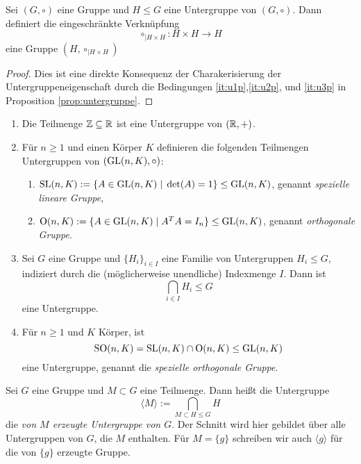 \documentclass{book}
\begin{document}
\begin{cor}
    Sei $(G,\circ)$ eine Gruppe und $H \leq G$ eine Untergruppe von $(G,\circ)$. Dann definiert die eingeschränkte Verknüpfung
    \[
        \circ_{|H \times H} : H \times H \to H
    \]
    eine Gruppe $(H, \circ_{|H \times H})$
\end{cor}
\begin{proof}
    Dies ist eine direkte Konsequenz der Charakerisierung der
    Untergruppeneigenschaft durch die Bedingungen \ref{it:u1p},\ref{it:u2p},
    und \ref{it:u3p} in Proposition \ref{prop:untergruppe}.
\end{proof}
    
\begin{exas}
\label{exas:untergruppen}
    \begin{enumerate}
        \item Die Teilmenge $\mathbb{Z} \subseteq \mathbb{R}$ ist eine Untergruppe von $(\mathbb{R},+)$. 
        \item Für $n \ge 1$ und einen Körper $K$ definieren die folgenden Teilmengen Untergruppen von $(\operatorname{GL}(n,K), \circ)$:
            \begin{enumerate}
                \item $\operatorname{SL}(n,K) := \{A \in \operatorname{GL}(n,K)\;  | \; \det(A) = 1 \} \leq \operatorname{GL}(n,K)$, genannt {\em spezielle lineare Gruppe},
                \item $\operatorname{O}(n,K) := \{A \in \operatorname{GL}(n,K)\; | \; A^TA = I_n \} \leq \operatorname{GL}(n,K)$, genannt {\em orthogonale Gruppe}.
            \end{enumerate}
        \item Sei $G$ eine Gruppe und $\{H_i\}_{i \in I}$ eine Familie von Untergruppen $H_i
            \leq G$, indiziert durch die (möglicherweise unendliche) Indexmenge $I$. Dann ist
            \[
                \bigcap_{i \in I} H_i \leq G
            \]
            eine Untergruppe. 
        \item Für $n \ge 1$ und $K$ Körper, ist 
            \[
                \operatorname{SO}(n,K) = \operatorname{SL}(n,K) \cap \operatorname{O}(n,K) \leq \operatorname{GL}(n,K)
            \]
            eine Untergruppe, genannt die {\em spezielle orthogonale Gruppe}.
    \end{enumerate}
\end{exas}


\begin{defi}
\label{defi:erzeugte} 
Sei $G$ eine Gruppe und $M \subset G$ eine Teilmenge. Dann heißt die
Untergruppe
\[
    \langle M \rangle := \bigcap_{M \subset H \leq G} H
\]
die {\em von $M$ erzeugte Untergruppe von $G$}. Der Schnitt wird hier gebildet
über alle Untergruppen von $G$, die $M$ enthalten. Für $M = \{g\}$ schreiben
wir auch $\langle g \rangle$ für die von $\{g\}$ erzeugte Gruppe. 
\end{defi}
\end{document}
